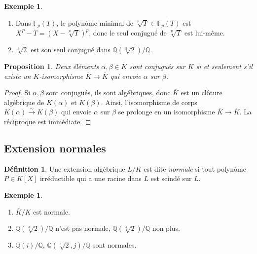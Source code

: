 \documentclass{article}
\newcommand{\Q}{\mathbb{Q}}
\newcommand{\F}{\mathbb{F}}
\theoremstyle{plain}
\newtheorem{proposition}[theorem]{Proposition}
\theoremstyle{definition}
\newtheorem{definition}[theorem]{Définition}
\newtheorem{example}[theorem]{Exemple}
\theoremstyle{remark}
\begin{document}
\begin{example} \leavevmode
    \begin{enumerate}
        \item Dans $\F_p(T)$, le polynôme minimal de $\sqrt[p]{T} \in \overline{\F_p(T)}$ est $X^P - T = (X - \sqrt[p]{T})^p$, donc le seul conjugué de $\sqrt[p]{T}$ est lui-même.
        \item $\sqrt[3]{2}$ est son seul conjugué dans $\Q(\sqrt[3]{2})/\Q$.
    \end{enumerate}
\end{example}

\begin{proposition}
    Deux éléments $\alpha,\beta \in \overline{K}$ sont conjugués sur $K$ si et seulement s'il existe un $K$-isomorphisme $\overline{K} \to \overline{K}$ qui envoie $\alpha$ sur $\beta$.
\end{proposition}

\begin{proof}
    Si $\alpha,\beta$ sont conjugués, ils sont algébriques, donc $\overline{K}$ est un clôture algébrique de $K(\alpha)$ et $K(\beta)$. Ainsi, l'isomorphisme de corps $K(\alpha) \xrightarrow{\sim} K(\beta)$ qui envoie $\alpha$ sur $\beta$ se prolonge en un isomorphisme $\overline{K} \to \overline{K}$. La réciproque est immédiate.
\end{proof}

\subsection{Extension normales}

\begin{definition}
    Une extension algébrique $L/K$ est dite \emph{normale} si tout polynôme $P \in K[X]$ irréductible qui a une racine dans $L$ est scindé sur $L$.
\end{definition}

\begin{example} \leavevmode
    \begin{enumerate}
        \item $\overline{K}/K$ est normale.
        \item $\Q(\sqrt[3]{2})/\Q$ n'est pas normale, $\Q(\sqrt[4]{2})/\Q$ non plus.
        \item $\Q(i)/\Q$, $\Q(\sqrt[3]{2}, j)/\Q$ sont normales.
    \end{enumerate}
\end{example}
\end{document}
